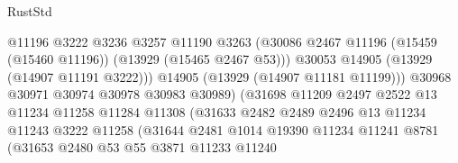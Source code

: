 \begin{lexlean}{RustStd}
\begin{coremodule}
                                          @11196
                                          @3222
                                          @3236
                                          @3257
                                          @11190
                                          @3263
                                          (@30086
                                            @2467
                                            @11196
                                            (@15459 (@15460 @11196))
                                            (@13929 (@15465 @2467 @53)))
                                          @30053
                                          @14905
                                          (@13929 (@14907 @11191 @3222)))
                                        @14905
                                        (@13929 (@14907 @11181 @11199)))
                                      @30968
                                      @30971
                                      @30974
                                      @30978
                                      @30983
                                      @30989)
                                    (@31698
                                      @11209
                                      @2497
                                      @2522
                                      @13
                                      @11234
                                      @11258
                                      @11284
                                      @11308
                                      (@31633
                                        @2482
                                        @2489
                                        @2496
                                        @13
                                        @11234
                                        @11243
                                        @3222
                                        @11258
                                        (@31644
                                          @2481
                                          @1014
                                          @19390
                                          @11234
                                          @11241
                                          @8781
                                          (@31653
                                            @2480
                                            @53
                                            @55
                                            @3871
                                            @11233
                                            @11240

\end{coremodule}
\end{lexlean}
